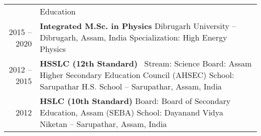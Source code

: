 \documentclass[a4paper, 11pt]{article}
\newcommand{\headingfont}{\Large\color{Bittersweet}}
\newenvironment{SectionTable}[1]{
	\renewcommand*{\arraystretch}{1.7}
	\setlength{\tabcolsep}{10pt}
	\begin{longtable}{Rp{5.2in}} & #1 \\}
{\end{longtable}\vspace{-.3cm}}
\begin{document}
\begin{SectionTable}{\headingfont Education}

2015 -- 2020 & 
\textbf{Integrated M.Sc. in Physics} \newline
Dibrugarh University -- Dibrugarh, Assam, India \newline 
Specialization: High Energy Physics \newline
\\ %


2012 -- 2015 & 
\textbf{HSSLC (12th Standard)} \ Stream: Science \newline
Board: Assam Higher Secondary Education Council (AHSEC) \newline 
School: Sarupathar H.S. School -- Sarupathar, Assam, India \newline
\\%

2012 &
\textbf{HSLC (10th Standard)} \newline
Board: Board of Secondary Education, Assam (SEBA) \newline 
School: Dayanand Vidya Niketan -- Sarupathar, Assam, India \newline
\\%


\end{SectionTable}






\end{document}
